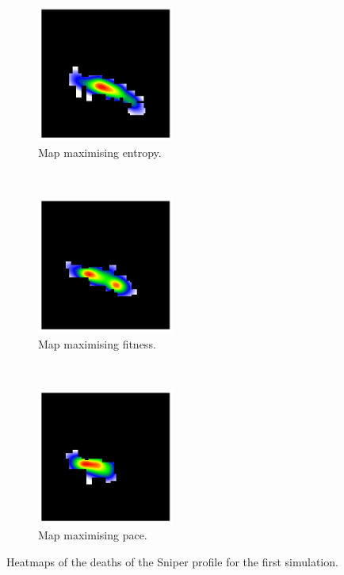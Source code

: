 \begin{figure}[H]
    \centering
    \begin{subfigure}[t]{0.3\textwidth}
        \centering
        \includegraphics[height=4.5cm]{Images/images/experiment_two/best_entropy_pop_0/deaths_bot_1.png}
        \caption{Map maximising entropy.}
    \end{subfigure}%
    ~ 
    \begin{subfigure}[t]{0.3\textwidth}
        \centering
        \includegraphics[height=4.5cm]{Images/images/experiment_two/best_fitness_pop_0/deaths_bot_1.png}
        \caption{Map maximising fitness.}
    \end{subfigure}
    ~ 
    \begin{subfigure}[t]{0.3\textwidth}
        \centering
        \includegraphics[height=4.5cm]{Images/images/experiment_two/best_pace_pop_0/deaths_bot_1.png}
        \caption{Map maximising pace.}
    \end{subfigure}
    \caption{Heatmaps of the deaths of the Sniper profile for the first simulation.}
\end{figure}
